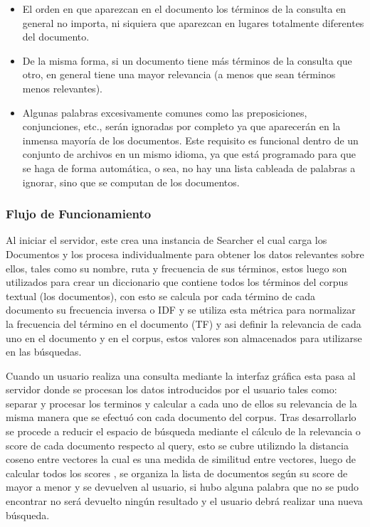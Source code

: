 \documentclass[12pt]{beamer}
\begin{document}
\begin{frame}
\begin{itemize}
\item El orden en que aparezcan en el documento los términos de la consulta en general no importa, ni siquiera que aparezcan en lugares totalmente diferentes del documento.
\item De la misma forma, si un documento tiene más términos de la consulta que otro, en general tiene una mayor relevancia (a menos que sean términos menos relevantes).
\item Algunas palabras excesivamente comunes como las preposiciones, conjunciones, etc., serán ignoradas por completo ya que aparecerán en la inmensa mayoría de los documentos. Este requisito es funcional dentro de un conjunto de archivos en un mismo idioma, ya que está programado para que se haga de forma automática, o sea, no hay una lista cableada de palabras a ignorar, sino que se computan de los documentos.
\end{itemize}
\end{frame}

\begin{frame}
\frametitle{Flujo de Funcionamiento}

Al iniciar el servidor, este crea una instancia de Searcher el cual carga los Documentos y los procesa individualmente para obtener los datos relevantes sobre ellos, tales como su nombre, ruta y frecuencia de sus términos, estos luego son utilizados para crear un diccionario que contiene todos los términos del corpus textual (los documentos), con esto se calcula por cada término de cada documento su frecuencia inversa o IDF y se utiliza esta métrica para normalizar la frecuencia del término en el documento (TF) y asi definir la relevancia de cada uno en el documento y en el corpus, estos valores son almacenados para utilizarse en las búsquedas.

\end{frame}

\begin{frame}
Cuando un usuario realiza una consulta mediante la interfaz gráfica esta pasa al servidor donde se procesan los datos introducidos por el usuario tales como: separar y procesar los terminos y calcular a cada uno de ellos su relevancia de la misma manera que se efectuó con cada documento del corpus. Tras desarrollarlo se procede a reducir el espacio de búsqueda mediante el cálculo de la relevancia o score de cada documento respecto al query, esto se cubre utilizndo la distancia coseno entre vectores la cual es una medida de similitud entre vectores, luego de calcular todos los scores , se organiza la lista de documentos según su score de mayor a menor y se devuelven al usuario, si hubo alguna palabra que no se pudo encontrar no será devuelto ningún resultado y el usuario debrá realizar una nueva búsqueda.
\end{frame}
\end{document}
